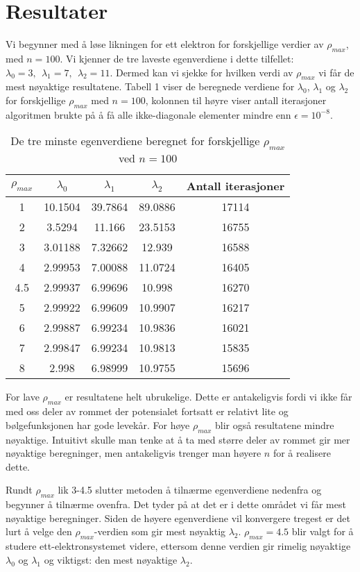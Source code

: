 \documentclass[norsk, 12pt]{article}
\begin{document}
\section{Resultater}
Vi begynner med å løse likningen for ett elektron for forskjellige verdier av $\rho_{max}$, med $n=100$. Vi kjenner
de tre laveste egenverdiene i dette tilfellet: $\lambda_0 = 3,\ \ \lambda_1 = 7,\ \ \lambda_2 = 11$. Dermed kan vi sjekke
for hvilken verdi av $\rho_{max}$ vi får de mest nøyaktige resultatene. Tabell 1 viser de beregnede verdiene for
$\lambda_0$, $\lambda_1$ og $\lambda_2$ for forskjellige $\rho_{max}$ med $n=100$, kolonnen til høyre viser antall
iterasjoner algoritmen brukte på å få alle ikke-diagonale elementer mindre enn $\epsilon = 10^{-8}$.
\begin{table}[h!]
\centering
 \begin{tabular}{|c|c|c|c|c|}\hline
  $\rho_{max}$ & $\lambda_0$ & $\lambda_1$ & $\lambda_2$ & Antall iterasjoner\\ \hline
  1 & 10.1504 & 39.7864 & 89.0886 & 17114\\
  2 & 3.5294 & 11.166 & 23.5153 & 16755\\
  3 & 3.01188 & 7.32662 & 12.939 & 16588\\
  4 & 2.99953 & 7.00088 & 11.0724 & 16405\\
  4.5 & 2.99937 & 6.99696 & 10.998 & 16270\\
  5 & 2.99922 & 6.99609 & 10.9907 & 16217\\
  6 & 2.99887 & 6.99234 & 10.9836 & 16021\\
  7 & 2.99847 & 6.99234 & 10.9813 & 15835\\
  8 & 2.998 & 6.98999 & 10.9755 & 15696\\ \hline
 \end{tabular}
 \caption{De tre minste egenverdiene beregnet for forskjellige $\rho_{max}$ ved $n=100$}
 \end{table}
 
 
For lave $\rho_{max}$ er resultatene helt ubrukelige. Dette er antakeligvis fordi vi ikke får med oss deler av rommet
der potensialet fortsatt er relativt lite og bølgefunksjonen har gode levekår. For høye $\rho_{max}$ blir også resultatene
mindre nøyaktige. Intuitivt skulle man tenke at å ta med større deler av rommet gir mer nøyaktige beregninger, men antakeligvis
trenger man høyere $n$ for å realisere dette.

Rundt $\rho_{max}$ lik 3-4.5 slutter metoden å tilnærme egenverdiene
nedenfra og begynner å tilnærme ovenfra. Det tyder på at det er i dette området vi får mest nøyaktige beregninger.
 Siden de høyere egenverdiene vil konvergere
tregest er det lurt å velge den $\rho_{max}$-verdien som gir mest nøyaktig $\lambda_2$.
$\rho_{max} = 4.5$ blir valgt for å studere ett-elektronsystemet videre, ettersom denne verdien gir rimelig nøyaktige 
$\lambda_0$ og $\lambda_1$ og viktigst: den mest nøyaktige $\lambda_2$.
\end{document}
